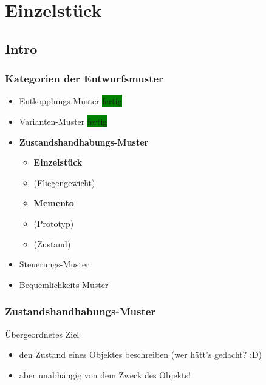 \documentclass[18pt]{beamer}
\begin{document}
	\section{Einzelstück}
	\subsection{Intro}
	\begin{frame}
		\frametitle{Kategorien der Entwurfsmuster}
		\begin{itemize}
			\item Entkopplungs-Muster \colorbox{green}{fertig}
			\item Varianten-Muster \colorbox{green}{fertig}
			\item \textbf{Zustandshandhabungs-Muster}
				\begin{itemize}
					\item \textbf{Einzelstück}
					\item (Fliegengewicht)
					\item \textbf{Memento} 
					\item (Prototyp) 
					\item (Zustand)
				\end{itemize}
			\item Steuerungs-Muster
			\item Bequemlichkeits-Muster
		\end{itemize}
	\end{frame}

	\begin{frame}
		\frametitle{Zustandshandhabungs-Muster}
		\begin{block}{Übergeordnetes Ziel}
			\begin{itemize}
				\item den Zustand eines Objektes beschreiben (wer hätt's gedacht? :D) \pause 
				\item aber unabhängig von dem Zweck des Objekts!
			\end{itemize}
		\end{block}
	\end{frame}
\end{document}
